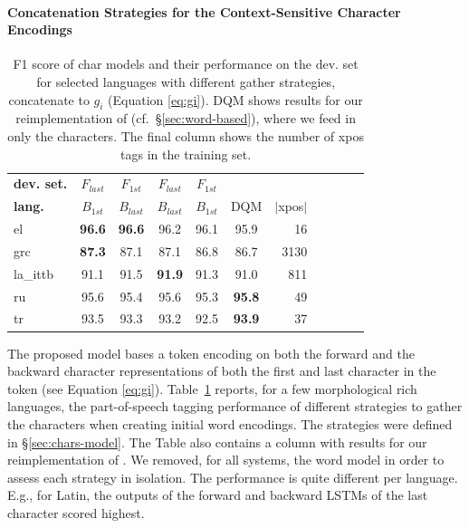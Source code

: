 \documentclass[11pt,a4paper]{article}
\newcommand{\forwardfirstnow}{\textit{F$_{1st}$}}
\newcommand{\backwardfirstnow}{\textit{B$_{1st}$}}
\newcommand{\forwardlastnow}{\textit{F$_{last}$}}
\newcommand{\backwardlastnow}{\textit{B$_{last}$}}
\begin{document}
\paragraph{Concatenation Strategies for the Context-Sensitive Character Encodings}
\begin{table}[t!]
\begin{center}
\small
\setlength{\tabcolsep}{5pt}
\begin{tabular}{|l|c|c|c|c|c|r|l||r|r|r}
\hline 
\bf dev. set.& $\forwardlastnow$ & $\forwardfirstnow$ & $\forwardlastnow$ & $\forwardfirstnow$ & & \\
\bf lang. & $\backwardfirstnow$ & $\backwardlastnow$ & $\backwardlastnow$ & $\backwardfirstnow$ & DQM & $|$xpos$|$\\ 
\hline
el	       &\bf 96.6	& \bf 96.6	&96.2	& 96.1	  & 95.9 &16\\ 
grc	       &\bf 87.3	& 87.1	& 87.1	&86.8     &86.7 &3130\\
la\_ittb   & 91.1	&91.5	&\bf 91.9	&91.3	  &91.0 &811\\
ru         & 95.6    & 95.4	& 95.6	&95.3	  &\bf95.8 &49\\
tr	       & 93.5   & 93.3	&93.2	&92.5     &\bf 93.9  &37\\ \hline
\end{tabular}
\end{center}

\caption{\label{table:char-models} F1 score of char models and their performance on the dev. set for selected languages
with different gather strategies, concatenate to $g_i$ (Equation \ref{eq:gi}).
DQM shows results for our reimplementation of  (cf.\ \S\ref{sec:word-based}), where we feed in only the characters. The final column shows the number of xpos tags in the training set.}
\vspace{-0.3cm}
\end{table}

The proposed model bases a token encoding on both the forward and the backward character representations of both the first and last character in the token (see Equation \ref{eq:gi}).
Table~\ref{table:char-models} reports, for a few morphological rich languages, the part-of-speech tagging performance of different strategies to gather the characters when creating initial word encodings. The strategies were defined in \S\ref{sec:chars-model}. The Table also contains a column with results for our reimplementation of . We removed, for all systems, the word model in order to assess each strategy in isolation. The performance is quite different per language. E.g., for Latin, the outputs of the forward and backward LSTMs of the last character scored highest.
\end{document}
